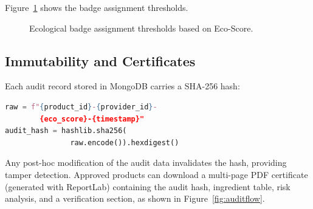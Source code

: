 \documentclass[10pt,a4paper,twocolumn]{article}
\begin{document}
Figure~\ref{fig:badges} shows the badge assignment thresholds.

\begin{figure}[H]
\centering
{}
\caption{Ecological badge assignment thresholds based on Eco-Score.}
\label{fig:badges}
\end{figure}

\subsection{Immutability and Certificates}

Each audit record stored in MongoDB carries a SHA-256 hash:
\begin{lstlisting}[language=Python, caption={Audit hash generation.}]
raw = f"{product_id}-{provider_id}-
        {eco_score}-{timestamp}"
audit_hash = hashlib.sha256(
               raw.encode()).hexdigest()
\end{lstlisting}
Any post-hoc modification of the audit data invalidates the hash,
providing tamper detection. Approved products can download a
multi-page PDF certificate (generated with ReportLab) containing
the audit hash, ingredient table, risk analysis, and a verification
section, as shown in Figure~\ref{fig:auditflow}.
\end{document}
